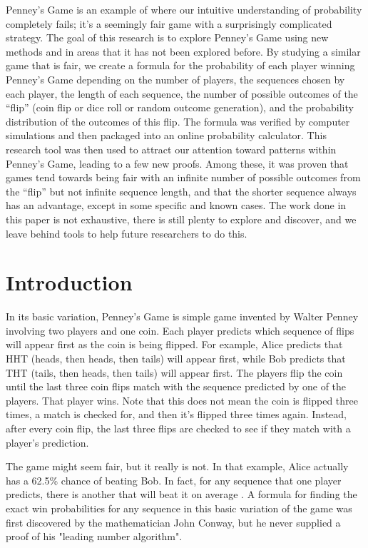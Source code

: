 \documentclass[english,12pt,a4paper,final]{article}
\begin{document}
Penney’s Game is an example of where our intuitive understanding of probability completely fails; it’s a seemingly fair game with a surprisingly complicated strategy. The goal of this research is to explore Penney’s Game using new methods and in areas that it has not been explored before. By studying a similar game that is fair, we create a formula for the probability of each player winning Penney’s Game depending on the number of players, the sequences chosen by each player, the length of each sequence, the number of possible outcomes of the “flip” (coin flip or dice roll or random outcome generation), and the probability distribution of the outcomes of this flip. The formula was verified by computer simulations and then packaged into an online probability calculator. This research tool was then used to attract our attention toward patterns within Penney's Game, leading to a few new proofs. Among these, it was proven that games tend towards being fair with an infinite number of possible outcomes from the “flip” but not infinite sequence length, and that the shorter sequence always has an advantage, except in some specific and known cases. The work done in this paper is not exhaustive, there is still plenty to explore and discover, and we leave behind tools to help future researchers to do this.

\part{Introduction}

In its basic variation, Penney's Game is simple game invented by Walter Penney involving two players and one coin. Each player predicts which sequence of flips will appear first as the coin is being flipped. For example, Alice predicts that HHT (heads, then heads, then tails) will appear first, while Bob predicts that THT (tails, then heads, then tails) will appear first. The players flip the coin until the last three coin flips match with the sequence predicted by one of the players. That player wins. Note that this does not mean the coin is flipped three times, a match is checked for, and then it's flipped three times again. Instead, after every coin flip, the last three flips are checked to see if they match with a player's prediction.

The game might seem fair, but it really is not. In that example, Alice actually has a 62.5\% chance of beating Bob. In fact, for any sequence that one player predicts, there is another that will beat it on average \parencite{penney}. A formula for finding the exact win probabilities for any sequence in this basic variation of the game was first discovered by the mathematician John Conway, but he never supplied a proof of his "leading number algorithm".
\end{document}
